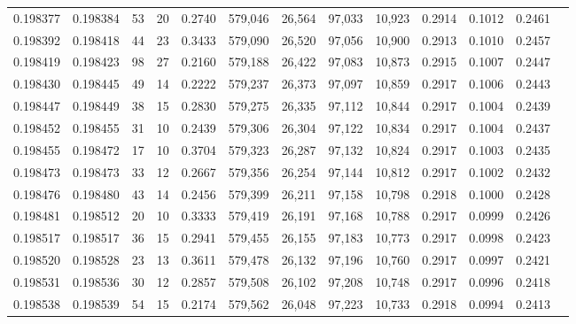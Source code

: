 \begin{tabular}{rrrrrrrrrrrrr}
0.198377 & 0.198384 &    53 &  20 &                                     0.2740 & 579,046 &  26,564 &  97,033 &  10,923 & 0.2914 & 0.1012 & 0.2461 \\
0.198392 & 0.198418 &    44 &  23 &                                     0.3433 & 579,090 &  26,520 &  97,056 &  10,900 & 0.2913 & 0.1010 & 0.2457 \\
0.198419 & 0.198423 &    98 &  27 &                                     0.2160 & 579,188 &  26,422 &  97,083 &  10,873 & 0.2915 & 0.1007 & 0.2447 \\
0.198430 & 0.198445 &    49 &  14 &                                     0.2222 & 579,237 &  26,373 &  97,097 &  10,859 & 0.2917 & 0.1006 & 0.2443 \\
0.198447 & 0.198449 &    38 &  15 &                                     0.2830 & 579,275 &  26,335 &  97,112 &  10,844 & 0.2917 & 0.1004 & 0.2439 \\
0.198452 & 0.198455 &    31 &  10 &                                     0.2439 & 579,306 &  26,304 &  97,122 &  10,834 & 0.2917 & 0.1004 & 0.2437 \\
0.198455 & 0.198472 &    17 &  10 &                                     0.3704 & 579,323 &  26,287 &  97,132 &  10,824 & 0.2917 & 0.1003 & 0.2435 \\
0.198473 & 0.198473 &    33 &  12 &                                     0.2667 & 579,356 &  26,254 &  97,144 &  10,812 & 0.2917 & 0.1002 & 0.2432 \\
0.198476 & 0.198480 &    43 &  14 &                                     0.2456 & 579,399 &  26,211 &  97,158 &  10,798 & 0.2918 & 0.1000 & 0.2428 \\
0.198481 & 0.198512 &    20 &  10 &                                     0.3333 & 579,419 &  26,191 &  97,168 &  10,788 & 0.2917 & 0.0999 & 0.2426 \\
0.198517 & 0.198517 &    36 &  15 &                                     0.2941 & 579,455 &  26,155 &  97,183 &  10,773 & 0.2917 & 0.0998 & 0.2423 \\
0.198520 & 0.198528 &    23 &  13 &                                     0.3611 & 579,478 &  26,132 &  97,196 &  10,760 & 0.2917 & 0.0997 & 0.2421 \\
0.198531 & 0.198536 &    30 &  12 &                                     0.2857 & 579,508 &  26,102 &  97,208 &  10,748 & 0.2917 & 0.0996 & 0.2418 \\
0.198538 & 0.198539 &    54 &  15 &                                     0.2174 & 579,562 &  26,048 &  97,223 &  10,733 & 0.2918 & 0.0994 & 0.2413 \\

\end{tabular}
